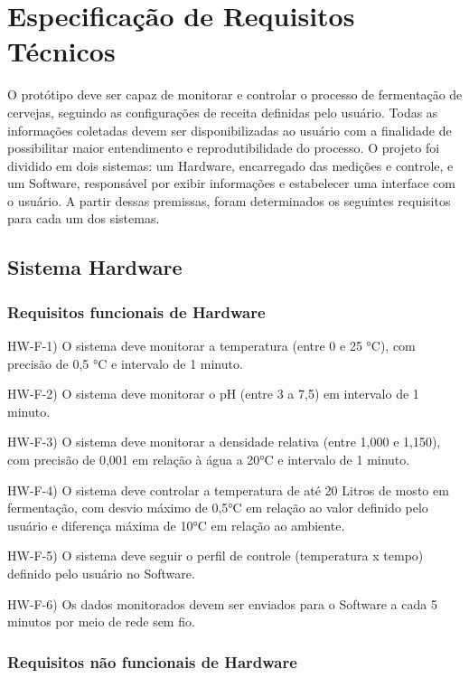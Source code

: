 \section{Especificação de Requisitos Técnicos}

O protótipo deve ser capaz de monitorar e controlar o processo de fermentação de cervejas, seguindo as configurações de receita definidas pelo usuário. 
Todas as informações coletadas devem ser disponibilizadas ao usuário com a finalidade de possibilitar maior entendimento e reprodutibilidade 
do processo. O projeto foi dividido em dois sistemas: um Hardware, encarregado das medições e controle, e um Software, responsável por exibir informações e estabelecer uma interface com o usuário. A partir dessas premissas, foram determinados os seguintes requisitos para cada um dos sistemas.

\subsection{Sistema Hardware}

\subsubsection{Requisitos funcionais de Hardware}

HW-F-1) O sistema deve monitorar a temperatura (entre 0 e 25 °C), com precisão de 0,5 °C e intervalo de 1 minuto.

HW-F-2) O sistema deve monitorar o pH (entre 3 a 7,5) em intervalo de 1 minuto.

HW-F-3) O sistema deve monitorar a densidade relativa (entre 1,000 e 1,150), com precisão de 0,001 em relação à água a 20°C e intervalo de 1 minuto.

HW-F-4) O sistema deve controlar a temperatura de até 20 Litros de mosto em fermentação, com desvio máximo de 0,5°C em relação ao valor definido pelo usuário e diferença máxima de 10°C em relação ao ambiente.

HW-F-5) O sistema deve seguir o perfil de controle (temperatura x tempo) definido pelo usuário no Software.

HW-F-6) Os dados monitorados devem ser enviados para o Software a cada 5 minutos por meio de rede sem fio.

\subsubsection{Requisitos não funcionais de Hardware}

